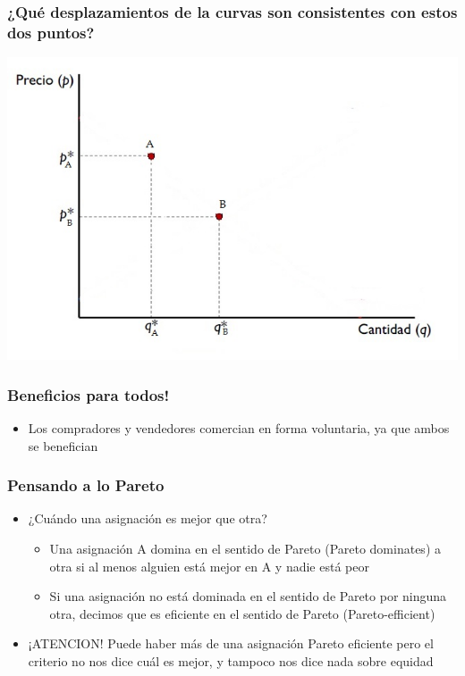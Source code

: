 \documentclass{beamer}
\begin{document}
\begin{frame}
\frametitle{¿Qué desplazamientos de la curvas son consistentes con estos dos puntos?}
\centering
\includegraphics[scale=0.6]{../Figures/Tema_07.6_equilibrioofertademanda3.jpg}
\end{frame}


\begin{frame}
\frametitle{Beneficios para todos!}
\begin{itemize}
    \item Los compradores y vendedores comercian en forma voluntaria, ya que ambos se benefician
\end{itemize}
\centering
\end{frame}

\begin{frame}
\frametitle{Pensando a lo Pareto}
\begin{itemize}
    \item ¿Cuándo una asignación es mejor que otra?
    \begin{itemize}
        \item Una asignación A domina en el sentido de Pareto (Pareto dominates) a otra si al menos alguien está mejor en A y nadie está peor
        \item Si una asignación no está dominada en el sentido de Pareto por ninguna otra, decimos que es eficiente en el sentido de Pareto (Pareto-efficient)
    \end{itemize}
    \item ¡ATENCION! Puede haber más de una asignación Pareto eficiente pero el criterio no nos dice cuál es mejor, y tampoco nos dice nada sobre equidad 
\end{itemize}
\end{frame}
\end{document}
